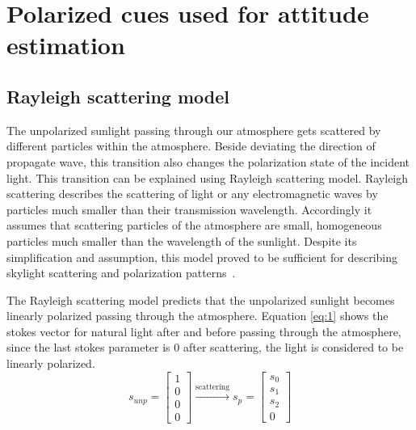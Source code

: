 \graphicspath{{./content/intro/figures/}}

\section{Polarized cues used for attitude estimation}
\label{sec:p2}


\subsection{Rayleigh scattering model}
\label{subsec:p21}
The unpolarized sunlight passing through our atmosphere gets scattered by
different particles within the atmosphere.  Beside deviating the direction of
propagate wave, this transition also changes the polarization state of the
incident light. This transition can be explained using Rayleigh scattering
model.  Rayleigh scattering describes the scattering of light or any
electromagnetic waves by particles much smaller than their transmission
wavelength. Accordingly it assumes that scattering particles of the atmosphere
are small, homogeneous particles much smaller than the wavelength of the
sunlight.  Despite its simplification and assumption, this model proved to be
sufficient for describing skylight scattering and polarization
patterns~\cite{pomozi2001clearsky, horvath2002ground}.

The Rayleigh scattering model predicts that the unpolarized sunlight becomes
linearly polarized passing through the atmosphere.
Equation \ref{eq:1} shows the stokes vector for natural light after and before
passing through the atmosphere, since the last stokes parameter is $0$ after
scattering, the light is considered to be linearly polarized.
\begin{equation}
  \label{eq:1}
  s_{unp} =
  \begin{bmatrix}
    1\\0\\0\\0
  \end{bmatrix}
  \xrightarrow[]{\text{scattering}}
  s_{p}=
  \begin{bmatrix}
   s_0 \\ s_1 \\ s_2 \\ 0
 \end{bmatrix}
\end{equation}

